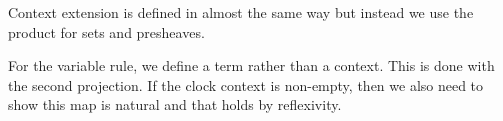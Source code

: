 Context extension is defined in almost the same way but instead we use the product for sets and presheaves.

\begin{code}%
\>[0]\AgdaOperator{\AgdaFunction{\AgdaUnderscore{},,\AgdaUnderscore{}}}\AgdaSpace{}%
\AgdaSymbol{:}\AgdaSpace{}%
\AgdaSymbol{\{}\AgdaSpace{}%
\AgdaSymbol{:}\AgdaSpace{}%
\AgdaSymbol{\}}\AgdaSpace{}%
\AgdaSpace{}%
\AgdaSpace{}%
\AgdaSpace{}%
\AgdaSpace{}%
\AgdaSpace{}%
\AgdaSpace{}%
\AgdaSpace{}%
\AgdaSpace{}%
\<%
\end{code}


For the variable rule, we define a term rather than a context.
This is done with the second projection.
If the clock context is non-empty, then we also need to show this map is natural and that holds by reflexivity.

\begin{code}%
\>[0]\AgdaSpace{}%
\AgdaSymbol{:}\AgdaSpace{}%
\AgdaSymbol{\{}\AgdaSpace{}%
\AgdaSymbol{:}\AgdaSpace{}%
\AgdaSymbol{\}}\AgdaSpace{}%
\AgdaSymbol{(}\AgdaSpace{}%
\AgdaSymbol{:}\AgdaSpace{}%
\AgdaSpace{}%
\AgdaSymbol{)}\AgdaSpace{}%
\AgdaSymbol{(}\AgdaSpace{}%
\AgdaSymbol{:}\AgdaSpace{}%
\AgdaSpace{}%
\AgdaSymbol{)}\AgdaSpace{}%
\AgdaSpace{}%
\AgdaSpace{}%
\AgdaSymbol{(}\AgdaSpace{}%
\AgdaOperator{\AgdaFunction{,,}}\AgdaSpace{}%
\AgdaSymbol{)}\AgdaSpace{}%
\<%
\end{code}

